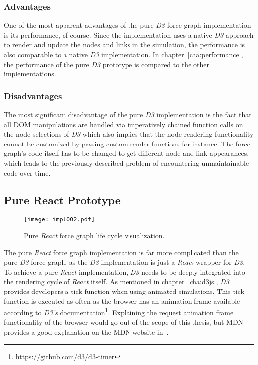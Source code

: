 \subsubsection{Advantages}

One of the most apparent advantages of the pure \emph{D3} force graph implementation is its performance, of course. Since the implementation uses a native \emph{D3} approach to render and update the nodes and links in the simulation, the performance is also comparable to a native \emph{D3} implementation. In chapter~\ref{cha:performance}, the performance of the pure \emph{D3} prototype is compared to the other implementations.

\subsubsection{Disadvantages}

The most sig\-nifi\-cant disadvantage of the pure \emph{D3} implementation is the fact that all DOM manipulations are handled via imperatively chained function calls on the node selections of \emph{D3} which also implies that the node rendering functionality cannot be customized by passing custom render functions for instance. The force graph's code itself has to be changed to get different node and link appearances, which leads to the previously described problem of encountering unmaintainable code over time.


\subsection{Pure React Prototype}
\label{sec:pureReactPrototype}

\begin{figure}
\centering
\texttt{[image: impl002.pdf]}
\caption{Pure \emph{React} force graph life cycle visualization.}
\label{fig:pureReactLifecycle}
\end{figure}

The pure \emph{React} force graph implementation is far more complicated than the pure \emph{D3} force graph, as the \emph{D3} implementation is just a \emph{React} wrapper for \emph{D3}. To achieve a pure \emph{React} implementation, \emph{D3} needs to be deeply integrated into the rendering cycle of \emph{React} itself. As mentioned in chapter~\ref{cha:d3js}, \emph{D3} provides developers a tick function when using animated simulations. This tick function is executed as often as the browser has an animation frame available according to \emph{D3's} documentation\footnote{\url{https://github.com/d3/d3-timer}}. Explaining the request animation frame functionality of the browser would go out of the scope of this thesis, but MDN provides a good explanation on the MDN website in~\cite{RAF}.

